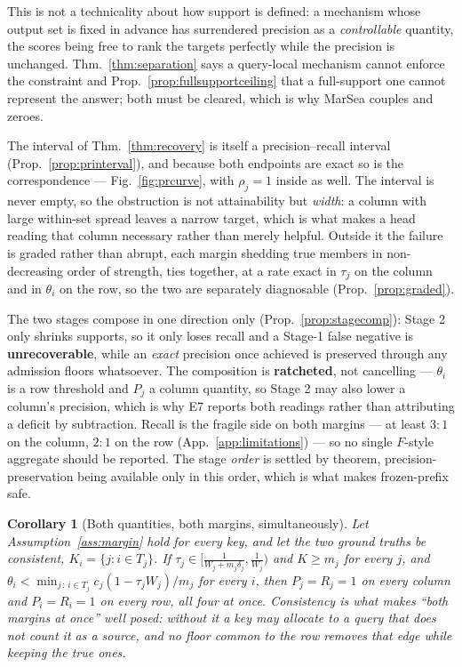 \documentclass{article}
\newtheorem{corollary}{Corollary}
\begin{document}
This is not a technicality about how support is defined: a mechanism whose output set is fixed in
advance has surrendered precision as a \emph{controllable} quantity, the scores being free to
rank the targets perfectly while the precision is unchanged. Thm.~\ref{thm:separation} says a
query-local mechanism cannot enforce the constraint and Prop.~\ref{prop:fullsupportceiling} that
a full-support one cannot represent the answer; both must be cleared, which is why MarSea couples
and zeroes.

The interval of Thm.~\ref{thm:recovery} is itself a precision--recall interval
(Prop.~\ref{prop:printerval}), and because both endpoints are exact so is the correspondence
--- Fig.~\ref{fig:prcurve}, with $\rho_j=1$ inside as well. The interval is never empty, so the
obstruction is not attainability but \emph{width}: a column with large within-set spread leaves a
narrow target, which is what makes a head reading that column necessary rather than merely
helpful. Outside it the failure is graded rather than abrupt, each margin shedding true members
in non-decreasing order of strength, ties together, at a rate exact in $\tau_j$ on the column and
in $\theta_i$ on the row, so the two are separately diagnosable (Prop.~\ref{prop:graded}).

The two stages compose in one direction only (Prop.~\ref{prop:stagecomp}): Stage 2 only shrinks
supports, so it only loses recall and a Stage-1 false negative is \textbf{unrecoverable}, while
an \emph{exact} precision once achieved is preserved through any admission floors whatsoever. The
composition is \textbf{ratcheted}, not cancelling --- $\theta_i$ is a row threshold and $P_j$ a
column quantity, so Stage 2 may also lower a column's precision, which is why E7 reports both
readings rather than attributing a deficit by subtraction. Recall is the fragile side on both
margins --- at least $3\!:\!1$ on the column, $2\!:\!1$ on the row
(App.~\ref{app:limitations}) --- so no single $F$-style aggregate should be reported. The stage \emph{order} is settled by theorem,
precision-preservation being available only in this order, which is what makes frozen-prefix safe.

\begin{corollary}[Both quantities, both margins, simultaneously]
\label{cor:joint}
Let Assumption~\ref{ass:margin} hold for every key, and let the two ground truths be
\emph{consistent}, $K_i=\{j : i\in T_j\}$. If $\tau_j\in[\frac{1}{W_j+m_j\delta_j},\frac{1}{W_j})$
and $K\ge m_j$ for every $j$, and
$\theta_i < \min_{j\,:\,i\in T_j} c_j(1-\tau_jW_j)/m_j$ for every $i$, then $P_j=R_j=1$ on every
column and $P_i=R_i=1$ on every row, all four at once. Consistency is what makes ``both margins
at once'' well posed: without it a key may allocate to a query that does not count it as a
source, and no floor common to the row removes that edge while keeping the true ones.
\end{corollary}
\end{document}
